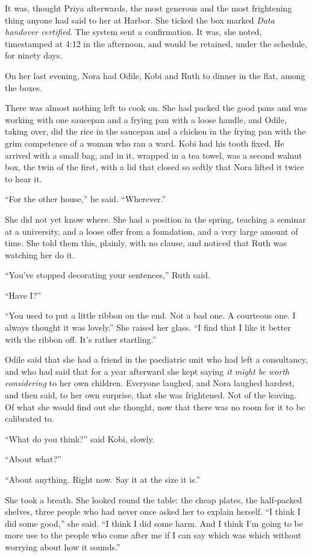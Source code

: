 It was, thought Priya afterwards, the most generous and the most frightening thing anyone had said to her at Harbor. She ticked the box marked \emph{Data handover certified}. The system sent a confirmation. It was, she noted, timestamped at 4:12 in the afternoon, and would be retained, under the schedule, for ninety days.

\scenebreak
\noindent On her last evening, Nora had Odile, Kobi and Ruth to dinner in the flat, among the boxes.

There was almost nothing left to cook on. She had packed the good pans and was working with one saucepan and a frying pan with a loose handle, and Odile, taking over, did the rice in the saucepan and a chicken in the frying pan with the grim competence of a woman who ran a ward. Kobi had his tooth fixed. He arrived with a small bag, and in it, wrapped in a tea towel, was a second walnut box, the twin of the first, with a lid that closed so softly that Nora lifted it twice to hear it.

``For the other house,'' he said. ``Wherever.''

She did not yet know where. She had a position in the spring, teaching a seminar at a university, and a loose offer from a foundation, and a very large amount of time. She told them this, plainly, with no clause, and noticed that Ruth was watching her do it.

``You've stopped decorating your sentences,'' Ruth said.

``Have I?''

``You used to put a little ribbon on the end. Not a bad one. A courteous one. I always thought it was lovely.'' She raised her glass. ``I find that I like it better with the ribbon off. It's rather startling.''

Odile said that she had a friend in the paediatric unit who had left a consultancy, and who had said that for a year afterward she kept saying \emph{it might be worth considering} to her own children. Everyone laughed, and Nora laughed hardest, and then said, to her own surprise, that she was frightened. Not of the leaving. Of what she would find out she thought, now that there was no room for it to be calibrated to.

``What do you think?'' said Kobi, slowly.

``About what?''

``About anything. Right now. Say it at the size it is.''

She took a breath. She looked round the table: the cheap plates, the half-packed shelves, three people who had never once asked her to explain herself. ``I think I did some good,'' she said. ``I think I did some harm. And I think I'm going to be more use to the people who come after me if I can say which was which without worrying about how it sounds.''


